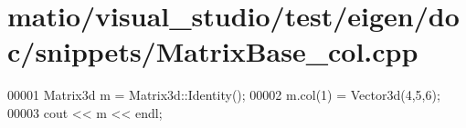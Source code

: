 \hypertarget{matio_2visual__studio_2test_2eigen_2doc_2snippets_2_matrix_base__col_8cpp_source}{}\section{matio/visual\+\_\+studio/test/eigen/doc/snippets/\+Matrix\+Base\+\_\+col.cpp}
\label{matio_2visual__studio_2test_2eigen_2doc_2snippets_2_matrix_base__col_8cpp_source}

\begin{DoxyCode}
00001 Matrix3d m = Matrix3d::Identity();
00002 m.col(1) = Vector3d(4,5,6);
00003 cout << m << endl;
\end{DoxyCode}
